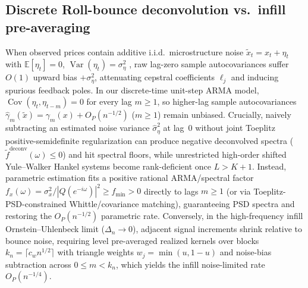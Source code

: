 \documentclass[12pt]{article}
\theoremstyle{definition}
\theoremstyle{remark}
\newcommand{\E}{\mathbb{E}}
\begin{document}
\subsection{Discrete Roll-bounce deconvolution vs.\ infill pre-averaging}\label{sec:preaveraging}
When observed prices contain additive i.i.d.\ microstructure noise $\tilde{x}_t = x_t + \eta_t$ with $\E[\eta_t] = 0$, $\operatorname{Var}(\eta_t) = \sigma_\eta^2$ \citep{roll1984}, raw lag-zero sample autocovariances suffer $O(1)$ upward bias $+\sigma_\eta^2$, attenuating cepstral coefficients $\ell_j$ and inducing spurious feedback poles. In our discrete-time unit-step ARMA model, $\operatorname{Cov}(\eta_t, \eta_{t-m}) = 0$ for every lag $m \ge 1$, so higher-lag sample autocovariances $\hat{\gamma}_m(\tilde{x}) = \gamma_m(x) + O_P(n^{-1/2})$ ($m \ge 1$) remain unbiased. Crucially, naively subtracting an estimated noise variance $\hat\sigma_\eta^2$ at lag~$0$ without joint Toeplitz positive-semidefinite regularization can produce negative deconvolved spectra ($\tilde f^{\mathrm{deconv}}(\omega) \le 0$) and hit spectral floors, while unrestricted high-order shifted Yule--Walker Hankel systems become rank-deficient once $L > K+1$. Instead, parametric estimation fits a positive rational ARMA/spectral factor $f_x(\omega) = \sigma_x^2 / |Q(e^{-i\omega})|^2 \ge f_{\min} > 0$ directly to lags $m \ge 1$ (or via Toeplitz-PSD-constrained Whittle/covariance matching), guaranteeing PSD spectra and restoring the $O_P(n^{-1/2})$ parametric rate. Conversely, in the high-frequency infill Ornstein--Uhlenbeck limit ($\Delta_n \to 0$), adjacent signal increments shrink relative to bounce noise, requiring level pre-averaged realized kernels over blocks $k_n = \lceil c_w n^{1/2}\rceil$ with triangle weights $w_j = \min(u, 1-u)$ \citep{jacod2009,barndorff2008} and noise-bias subtraction across $0 \le m < k_n$, which yields the infill noise-limited rate $O_P(n^{-1/4})$.
\end{document}

